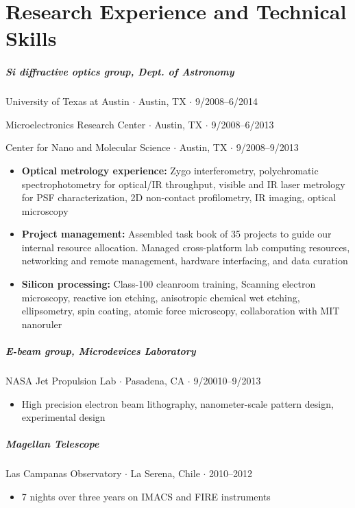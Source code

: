 \documentclass[10pt,letterpaper]{article}
\begin{document}
\section*{Research Experience and Technical Skills}

\subparagraph{Si diffractive optics group, Dept. of Astronomy}
University of Texas at Austin $\cdot$ Austin, TX $\cdot$ 9/2008--6/2014
\begin{flushright}
Microelectronics Research Center $\cdot$ Austin, TX $\cdot$ 9/2008--6/2013 

Center for Nano and Molecular Science $\cdot$ Austin, TX $\cdot$ 9/2008--9/2013
\end{flushright}

\begin{itemize}
    \item  \textbf{Optical metrology experience:} Zygo interferometry, polychromatic spectrophotometry for optical/IR throughput, visible and IR laser metrology for PSF characterization, 2D non-contact profilometry, IR imaging, optical microscopy
    \item \textbf{Project management:} Assembled task book of 35 projects to guide our internal resource allocation.  Managed cross-platform lab computing resources, networking and remote management, hardware interfacing, and data curation
\end{itemize}

\begin{itemize}
    \item \textbf{Silicon processing:} Class-100 cleanroom training, Scanning electron microscopy, reactive ion etching, anisotropic chemical wet etching, ellipsometry, spin coating,  atomic force microscopy, collaboration with MIT nanoruler
\end{itemize}

\subparagraph{E-beam group, Microdevices Laboratory}
NASA Jet Propulsion Lab $\cdot$ Pasadena, CA $\cdot$ 9/20010--9/2013
\begin{itemize}
    \item High precision electron beam lithography, nanometer-scale pattern design, experimental design
\end{itemize}

\subparagraph{Magellan Telescope}
Las Campanas Observatory $\cdot$ La Serena, Chile $\cdot$ 2010--2012
\begin{itemize}
    \item 7 nights over three years on IMACS and FIRE instruments
\end{itemize}
\end{document}
